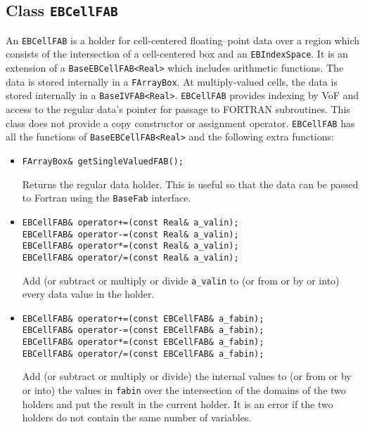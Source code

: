 \subsection{Class {\tt EBCellFAB}}
\label{sec::ebcellfab}

An {\tt EBCellFAB} is a holder for cell-centered 
floating--point data over a region
which consists of the intersection
of a cell-centered box and an {\tt EBIndexSpace}.  It is 
an extension of a \verb/BaseEBCellFAB<Real>/ which includes
arithmetic functions.  
The data is stored internally in a \verb/FArrayBox/.  At multiply-valued
cells, the data is stored internally in a  {\verb/BaseIVFAB<Real>/}.
{\tt EBCellFAB} provides indexing by VoF and access to the regular
data's pointer for passage to FORTRAN subroutines.
This class does not provide a copy constructor or assignment operator.  
{\tt EBCellFAB} has all the functions of \verb/BaseEBCellFAB<Real>/
and the following extra functions:
\begin{itemize}

\item \begin{verbatim}
FArrayBox& getSingleValuedFAB();
\end{verbatim}
Returns the regular data holder.  This is useful so
that the data can be passed to Fortran using the {\tt BaseFab} interface.

\item \begin{verbatim}
EBCellFAB& operator+=(const Real& a_valin);
EBCellFAB& operator-=(const Real& a_valin);
EBCellFAB& operator*=(const Real& a_valin);
EBCellFAB& operator/=(const Real& a_valin);
\end{verbatim}
Add (or subtract or multiply or divide 
\verb/a_valin/ to (or from or by or into)  every data value in the holder.


\item \begin{verbatim}
EBCellFAB& operator+=(const EBCellFAB& a_fabin);
EBCellFAB& operator-=(const EBCellFAB& a_fabin);
EBCellFAB& operator*=(const EBCellFAB& a_fabin);
EBCellFAB& operator/=(const EBCellFAB& a_fabin);
\end{verbatim}
Add (or subtract or multiply or divide) the internal values 
to (or from or by or into) the values in {\verb/fabin/}
over the intersection of the domains of the two holders
and put the result in the current holder.
It is an error if the two holders do not contain the same number
of variables.

\end{itemize}



